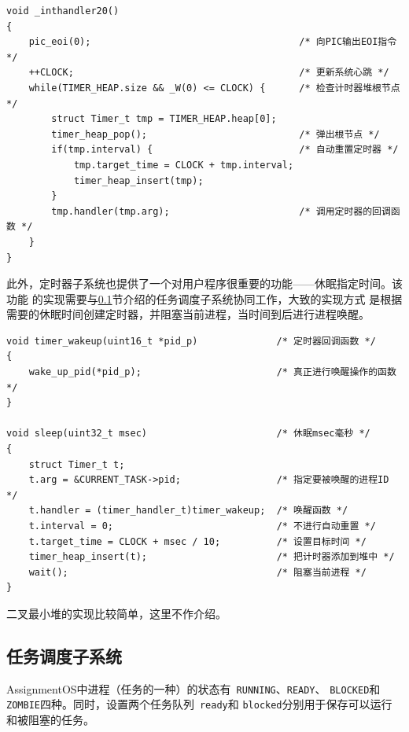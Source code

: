 \documentclass[a4paper, adobefonts]{ctexart}
\begin{document}
\begin{verbatim}
void _inthandler20()
{
    pic_eoi(0);                                     /* 向PIC输出EOI指令 */
    ++CLOCK;                                        /* 更新系统心跳 */
    while(TIMER_HEAP.size && _W(0) <= CLOCK) {      /* 检查计时器堆根节点 */
        struct Timer_t tmp = TIMER_HEAP.heap[0];
        timer_heap_pop();                           /* 弹出根节点 */
        if(tmp.interval) {                          /* 自动重置定时器 */
            tmp.target_time = CLOCK + tmp.interval;
            timer_heap_insert(tmp);
        }
        tmp.handler(tmp.arg);                       /* 调用定时器的回调函数 */
    }
}
\end{verbatim}

此外，定时器子系统也提供了一个对用户程序很重要的功能——休眠指定时间。该功能
的实现需要与\ref{scheduler}节介绍的任务调度子系统协同工作，大致的实现方式
是根据需要的休眠时间创建定时器，并阻塞当前进程，当时间到后进行进程唤醒。

\begin{verbatim}
void timer_wakeup(uint16_t *pid_p)              /* 定时器回调函数 */
{
    wake_up_pid(*pid_p);                        /* 真正进行唤醒操作的函数 */
}

void sleep(uint32_t msec)                       /* 休眠msec毫秒 */
{
    struct Timer_t t;
    t.arg = &CURRENT_TASK->pid;                 /* 指定要被唤醒的进程ID */
    t.handler = (timer_handler_t)timer_wakeup;  /* 唤醒函数 */
    t.interval = 0;                             /* 不进行自动重置 */
    t.target_time = CLOCK + msec / 10;          /* 设置目标时间 */
    timer_heap_insert(t);                       /* 把计时器添加到堆中 */
    wait();                                     /* 阻塞当前进程 */
}
\end{verbatim}

二叉最小堆的实现比较简单，这里不作介绍。

\subsection{任务调度子系统}\label{scheduler}
AssignmentOS中进程（任务的一种）的状态有~\verb|RUNNING|、\verb|READY|、
\verb|BLOCKED|和\verb|ZOMBIE|四种。同时，设置两个任务队列~\verb|ready|和
\verb|blocked|分别用于保存可以运行和被阻塞的任务。
\end{document}
